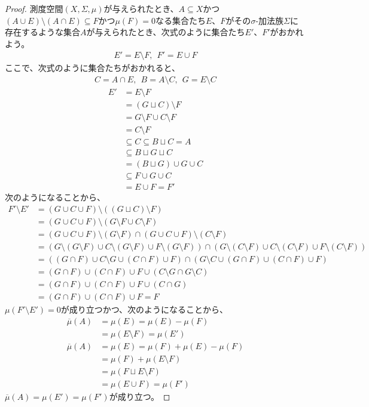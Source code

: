 \documentclass[dvipdfmx]{jsarticle}
\begin{document}
\begin{proof}
測度空間$(X,\varSigma,\mu)$が与えられたとき、$A \subseteq X$かつ$(A \cup E) \setminus (A \cap E) \subseteq F$かつ$\mu(F) = 0$なる集合たち$E$、$F$がその$\sigma$-加法族$\varSigma$に存在するような集合$A$が与えられたとき、次式のように集合たち$E'$、$F'$がおかれよう。
\begin{align*}
E' = E \setminus F,\ \ F' = E \cup F
\end{align*}
ここで、次式のように集合たちがおかれると、
\begin{align*}
C = A \cap E,\ \ B = A \setminus C,\ \ G = E \setminus C
\end{align*}
\begin{align*}
E' &= E \setminus F\\
&= (G \sqcup C) \setminus F\\
&= G \setminus F \cup C \setminus F\\
&= C \setminus F\\
&\subseteq C \subseteq B \sqcup C = A\\
&\subseteq B \sqcup G \sqcup C\\
&= (B \sqcup G) \cup G \cup C\\
&\subseteq F \cup G \cup C\\
&= E \cup F = F'
\end{align*}
次のようになることから、
\begin{align*}
F' \setminus E' &= (G \cup C \cup F) \setminus \left( (G \sqcup C) \setminus F \right)\\
&= (G \cup C \cup F) \setminus (G \setminus F \cup C \setminus F)\\
&= (G \cup C \cup F) \setminus (G \setminus F) \cap (G \cup C \cup F) \setminus (C \setminus F)\\
&= \left( G \setminus (G \setminus F) \cup C \setminus (G \setminus F) \cup F \setminus (G \setminus F) \right) \cap \left( G \setminus (C \setminus F) \cup C \setminus (C \setminus F) \cup F \setminus (C \setminus F) \right)\\
&= \left( (G \cap F) \cup C \setminus G \cup (C \cap F) \cup F \right) \cap \left( G \setminus C \cup (G \cap F) \cup (C \cap F) \cup F \right)\\
&= (G \cap F) \cup (C \cap F) \cup F \cup (C \setminus G \cap G \setminus C)\\
&= (G \cap F) \cup (C \cap F) \cup F \cup (C \cap G)\\
&= (G \cap F) \cup (C \cap F) \cup F = F
\end{align*}
$\mu\left( F' \setminus E' \right) = 0$が成り立つかつ、次のようになることから、
\begin{align*}
\overline{\mu}(A) &= \mu(E) = \mu(E) - \mu(F)\\
&= \mu(E \setminus F) = \mu\left( E' \right)\\
\overline{\mu}(A) &= \mu(E) = \mu(F) + \mu(E) - \mu(F)\\
&= \mu(F) + \mu(E \setminus F)\\
&= \mu(F \sqcup E \setminus F)\\
&= \mu(E \cup F) = \mu\left( F' \right)
\end{align*}
$\overline{\mu}(A) = \mu\left( E' \right) = \mu\left( F' \right)$が成り立つ。
\end{proof}
\end{document}
